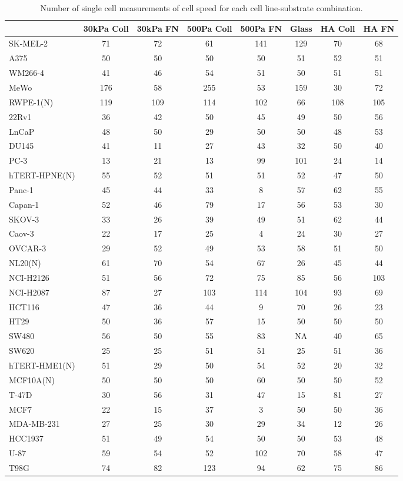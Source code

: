 \begin{table}[!h]
\centering
\caption{Number of single cell measurements of cell speed for each cell line-substrate combination.
  \label{tab:count- motility}}
\centering
\begin{tabular}[t]{lccccccc}
\toprule
  & 30kPa Coll & 30kPa FN & 500Pa Coll & 500Pa FN & Glass & HA Coll & HA FN\\
\midrule
SK-MEL-2 & 71 & 72 & 61 & 141 & 129 & 70 & 68\\
A375 & 50 & 50 & 50 & 50 & 51 & 52 & 51\\
WM266-4 & 41 & 46 & 54 & 51 & 50 & 51 & 51\\
MeWo & 176 & 58 & 255 & 53 & 159 & 30 & 72\\
RWPE-1(N) & 119 & 109 & 114 & 102 & 66 & 108 & 105\\
22Rv1 & 36 & 42 & 50 & 45 & 49 & 50 & 56\\
LnCaP & 48 & 50 & 29 & 50 & 50 & 48 & 53\\
DU145 & 41 & 11 & 27 & 43 & 32 & 50 & 40\\
PC-3 & 13 & 21 & 13 & 99 & 101 & 24 & 14\\
hTERT-HPNE(N) & 55 & 52 & 51 & 51 & 52 & 47 & 50\\
Panc-1 & 45 & 44 & 33 & 8 & 57 & 62 & 55\\
Capan-1 & 52 & 46 & 79 & 17 & 56 & 53 & 30\\
SKOV-3 & 33 & 26 & 39 & 49 & 51 & 62 & 44\\
Caov-3 & 22 & 17 & 25 & 4 & 24 & 30 & 27\\
OVCAR-3 & 29 & 52 & 49 & 53 & 58 & 51 & 50\\
NL20(N) & 61 & 70 & 54 & 67 & 26 & 45 & 44\\
NCI-H2126 & 51 & 56 & 72 & 75 & 85 & 56 & 103\\
NCI-H2087 & 87 & 27 & 103 & 114 & 104 & 93 & 69\\
HCT116 & 47 & 36 & 44 & 9 & 70 & 26 & 23\\
HT29 & 50 & 36 & 57 & 15 & 50 & 50 & 50\\
SW480 & 56 & 50 & 55 & 83 & NA & 40 & 65\\
SW620 & 25 & 25 & 51 & 51 & 25 & 51 & 36\\
hTERT-HME1(N) & 51 & 29 & 50 & 54 & 52 & 20 & 32\\
MCF10A(N) & 50 & 50 & 50 & 60 & 50 & 50 & 52\\
T-47D & 30 & 56 & 31 & 47 & 15 & 81 & 27\\
MCF7 & 22 & 15 & 37 & 3 & 50 & 50 & 36\\
MDA-MB-231 & 27 & 25 & 30 & 29 & 34 & 12 & 26\\
HCC1937 & 51 & 49 & 54 & 50 & 50 & 53 & 48\\
U-87 & 59 & 54 & 52 & 102 & 70 & 58 & 47\\
T98G & 74 & 82 & 123 & 94 & 62 & 75 & 86\\
\bottomrule
\end{tabular}
\end{table}
